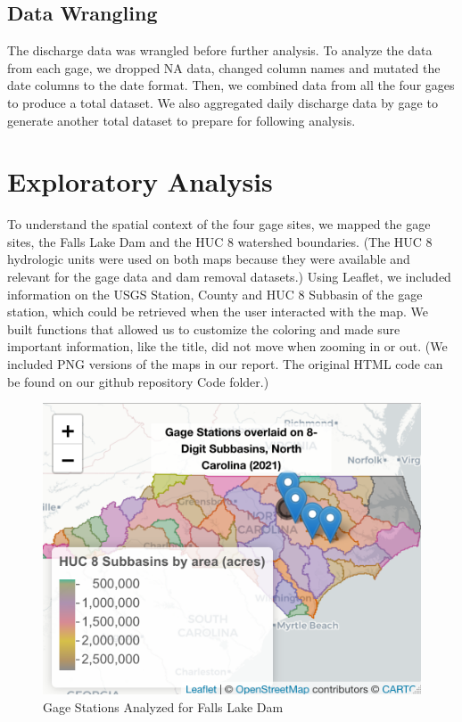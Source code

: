 \documentclass[
  12pt,
]{article}
\begin{document}
\hypertarget{data-wrangling}{%
\subsection{Data Wrangling}\label{data-wrangling}}

The discharge data was wrangled before further analysis. To analyze the
data from each gage, we dropped NA data, changed column names and
mutated the date columns to the date format. Then, we combined data from
all the four gages to produce a total dataset. We also aggregated daily
discharge data by gage to generate another total dataset to prepare for
following analysis.

\newpage

\hypertarget{exploratory-analysis}{%
\section{Exploratory Analysis}\label{exploratory-analysis}}

To understand the spatial context of the four gage sites, we mapped the
gage sites, the Falls Lake Dam and the HUC 8 watershed boundaries. (The
HUC 8 hydrologic units were used on both maps because they were
available and relevant for the gage data and dam removal datasets.)
Using Leaflet, we included information on the USGS Station, County and
HUC 8 Subbasin of the gage station, which could be retrieved when the
user interacted with the map. We built functions that allowed us to
customize the coloring and made sure important information, like the
title, did not move when zooming in or out. (We included PNG versions of
the maps in our report. The original HTML code can be found on our
github repository Code folder.)

\begin{figure}
\centering
\includegraphics{"./Output/gage.station.png"}
\caption{Gage Stations Analyzed for Falls Lake Dam}
\end{figure}
\end{document}
